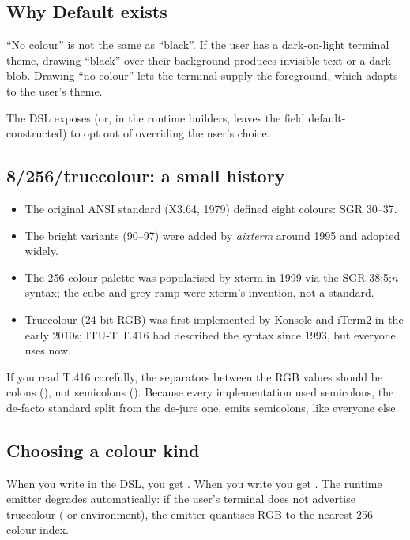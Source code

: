 \subsection*{Why Default exists}

``No colour'' is not the same as ``black''. If the user has a
dark-on-light terminal theme, drawing ``black'' over their
background produces invisible text or a dark blob. Drawing ``no
colour'' lets the terminal supply the foreground, which adapts
to the user's theme.

The DSL exposes  (or, in the runtime
builders, leaves the  field default-constructed) to
opt out of overriding the user's choice.

\subsection*{8/256/truecolour: a small history}

\begin{itemize}[leftmargin=*]
  \item The original ANSI standard (X3.64, 1979) defined eight
    colours: SGR 30--37.
  \item The bright variants (90--97) were added by \emph{aixterm}
    around 1995 and adopted widely.
  \item The 256-colour palette was popularised by xterm in 1999
    via the SGR 38;5;$n$ syntax; the cube and grey ramp were
    xterm's invention, not a standard.
  \item Truecolour (24-bit RGB) was first implemented by
    Konsole and iTerm2 in the early 2010s; ITU-T T.416 had
    described the syntax  since 1993, but
    everyone uses  now.
\end{itemize}

\begin{funfact}
If you read T.416 carefully, the separators between the RGB
values should be colons (\code{:}), not semicolons (\code{;}).
Because every implementation used semicolons, the de-facto
standard split from the de-jure one. \maya{} emits semicolons,
like everyone else.
\end{funfact}

\subsection*{Choosing a colour kind}

When you write  in the DSL, you get
. When you write  you get
. The runtime emitter degrades
automatically: if the user's terminal does not advertise
truecolour ( or  environment), the
emitter quantises RGB to the nearest 256-colour index.

